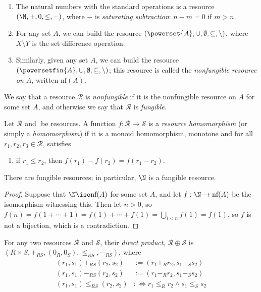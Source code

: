 \documentclass[10pt]{article}
\begin{document}
\begin{enumerate}
    \item The natural numbers with the standard operations is a resource $(\N, +, 0, \leq, -)$, where $-$ is \emph{saturating subtraction}: $n - m = 0$ if $m > n$.
    \item For any set $A$, we can build the resource $(\powerset{A}, \cup, \emptyset, \subseteq, \setminus)$, where $X \setminus Y$ is the set difference operation.
    \item Similarly, given any set $A$, we can build the resource $(\powersetfin{A}, \cup, \emptyset, \subseteq, \setminus)$; this resource is called the \emph{nonfungible resource on $A$}, written $\text{nf}(A)$.
\end{enumerate}

\begin{definition}
    We say that a resource $\mathcal{R}$ is \emph{nonfungible} if it is the nonfungible resource on $A$ for some set $A$, and otherwise we say that $\mathcal{R}$ is \emph{fungible}.
\end{definition}

\begin{definition}
    Let $\mathcal{R}$ and $\mathcal{}$ be resources.
    A function $f : \mathcal{R} \to \mathcal{S}$ is a \emph{resource homomorphism} (or simply a \emph{homomorphism}) if it is a monoid homomorphism, monotone and for all $r_1,r_2,r_3 \in \mathcal{R}$, satisfies
    \begin{enumerate}[label=(\roman*)]
        \item if $r_1 \leq r_2$, then $f(r_1) - f(r_2) = f(r_1 - r_2)$.
    \end{enumerate}
\end{definition}

\begin{proposition}
    There are fungible resources; in particular, $\N$ is a fungible resource.
\end{proposition}
\begin{proof}
    Suppose that $\N \iso \text{nf}(A)$ for some set $A$, and let $f : \N \to \text{nf}(A)$ be the isomorphism witnessing this.
    Then let $n > 0$, so $f(n) = f(1 + \cdots + 1) = f(1) + \cdots + f(1) = \bigcup_{i < n} f(1) = f(1)$, so $f$ is not a bijection, which is a contradiction.
\end{proof}

\begin{definition}
    For any two resources $\mathcal{R}$ and $\mathcal{S}$, their \emph{direct product}, $\mathcal{R} \oplus \mathcal{S}$ is $(R \times S, +_{RS}, (0_R, 0_S), \leq_{RS}, -_{RS})$, where
    \begin{align*}
        (r_1, s_1) +_{RS} (r_2, s_2) &:= (r_1 +_R r_2, s_1 +_S s_2) \\
        (r_1, s_1) -_{RS} (r_2, s_2) &:= (r_1 -_R r_2, s_1 -_S s_2) \\
        (r_1, s_1) \leq_{RS} (r_2, s_2) &:\iff r_1 \leq_R r_2 \land s_1 \leq_S s_2
    \end{align*}
\end{definition}
\end{document}
